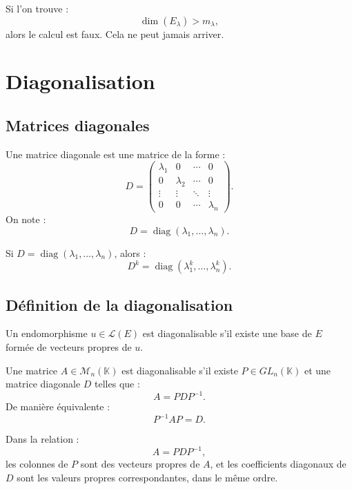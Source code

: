 \documentclass[11pt,a4paper]{article}
\newcommand{\K}{\mathbb K}
\newcommand{\M}{\mathcal M}
\newcommand{\Lcal}{\mathcal L}
\newcommand{\diag}{\operatorname{diag}}
\begin{document}
\begin{erreurbox}
Si l'on trouve :
\[
\dim(E_\lambda)>m_\lambda,
\]
alors le calcul est faux.  
Cela ne peut jamais arriver.
\end{erreurbox}

\section{Diagonalisation}

\subsection{Matrices diagonales}

\begin{definitionbox}
Une matrice diagonale est une matrice de la forme :
\[
D=
\begin{pmatrix}
\lambda_1&0&\cdots&0\\
0&\lambda_2&\cdots&0\\
\vdots&\vdots&\ddots&\vdots\\
0&0&\cdots&\lambda_n
\end{pmatrix}.
\]
On note :
\[
D=\diag(\lambda_1,\dots,\lambda_n).
\]
\end{definitionbox}

\begin{retenirbox}
Si \(D=\diag(\lambda_1,\dots,\lambda_n)\), alors :
\[
D^k=\diag(\lambda_1^k,\dots,\lambda_n^k).
\]
\end{retenirbox}

\subsection{Définition de la diagonalisation}

\begin{definitionbox}
Un endomorphisme \(u\in\Lcal(E)\) est diagonalisable s'il existe une base de \(E\) formée de vecteurs propres de \(u\).
\end{definitionbox}

\begin{definitionbox}
Une matrice \(A\in\M_n(\K)\) est diagonalisable s'il existe \(P\in GL_n(\K)\) et une matrice diagonale \(D\) telles que :
\[
A=PDP^{-1}.
\]
De manière équivalente :
\[
P^{-1}AP=D.
\]
\end{definitionbox}

\begin{retenirbox}
Dans la relation :
\[
A=PDP^{-1},
\]
les colonnes de \(P\) sont des vecteurs propres de \(A\), et les coefficients diagonaux de \(D\) sont les valeurs propres correspondantes, dans le même ordre.
\end{retenirbox}
\end{document}
